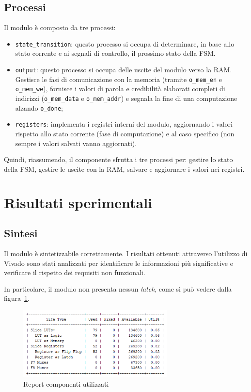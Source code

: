 \documentclass[12pt]{article}
\begin{document}
\subsection{Processi}

Il modulo è composto da tre processi:
\begin{itemize}
    \item \texttt{state\_transition}: questo processo si occupa di determinare, in base allo stato corrente e ai segnali di controllo, il prossimo stato della FSM\@.
    \item \texttt{output}: questo processo si occupa delle uscite del modulo verso la RAM\@. Gestisce le fasi di comunicazione con la memoria (tramite \texttt{o\_mem\_en} e \texttt{o\_mem\_we}), fornisce i valori di parola e credibilità elaborati completi di indirizzi (\texttt{o\_mem\_data} e \texttt{o\_mem\_addr}) e segnala la fine di una computazione alzando \texttt{o\_done};
    \item \texttt{registers}: implementa i registri interni del modulo, aggiornando i valori rispetto allo stato corrente (fase di computazione) e al caso specifico (non sempre i valori salvati vanno aggiornati).
\end{itemize}

Quindi, riassumendo, il componente sfrutta i tre processi per: gestire lo stato della FSM, gestire le uscite con la RAM, salvare e aggiornare i valori nei registri.

\section{Risultati sperimentali}

\subsection{Sintesi}

Il modulo è sintetizzabile correttamente.
I risultati ottenuti attraverso l'utilizzo di Vivado sono stati analizzati per identificare le informazioni più significative e verificare il rispetto dei requisiti non funzionali.

In particolare, il modulo non presenta nessun \textit{latch}, come si può vedere dalla figura~\ref{fig:latch}.

\begin{figure}[ht]
    \centering
    \includegraphics[width=0.7\textwidth]{utilization_report.png}
    \caption{Report componenti utilizzati}\label{fig:latch}
\end{figure}
\end{document}
